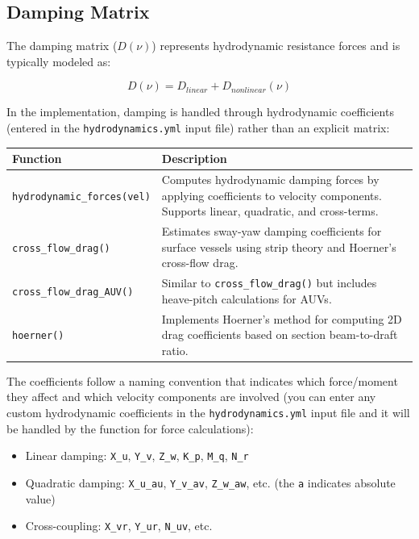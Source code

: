 \documentclass[
  letterpaper,
  DIV=11,
  numbers=noendperiod]{scrreprt}
\providecommand{\tightlist}{%
  \setlength{\itemsep}{0pt}\setlength{\parskip}{0pt}}\usepackage{longtable,booktabs,array}
\begin{document}
\subsection*{Damping Matrix}\label{damping-matrix}

The damping matrix (\(D(\nu)\)) represents hydrodynamic resistance
forces and is typically modeled as:

\[D(\nu) = D_{linear} + D_{nonlinear}(\nu)\]

In the implementation, damping is handled through hydrodynamic
coefficients (entered in the \texttt{hydrodynamics.yml} input file)
rather than an explicit matrix:

\begin{longtable}[]{@{}
  >{\raggedright\arraybackslash}p{}
  >{\raggedright\arraybackslash}p{}@{}}
\toprule\noalign{}
\begin{minipage}[b]{\linewidth}\raggedright
Function
\end{minipage} & \begin{minipage}[b]{\linewidth}\raggedright
Description
\end{minipage} \\
\midrule\noalign{}
\endhead
\bottomrule\noalign{}
\endlastfoot
\texttt{hydrodynamic\_forces(vel)} & Computes hydrodynamic damping
forces by applying coefficients to velocity components. Supports linear,
quadratic, and cross-terms. \\
\texttt{cross\_flow\_drag()} & Estimates sway-yaw damping coefficients
for surface vessels using strip theory and Hoerner's cross-flow drag. \\
\texttt{cross\_flow\_drag\_AUV()} & Similar to
\texttt{cross\_flow\_drag()} but includes heave-pitch calculations for
AUVs. \\
\texttt{hoerner()} & Implements Hoerner's method for computing 2D drag
coefficients based on section beam-to-draft ratio. \\
\end{longtable}

The coefficients follow a naming convention that indicates which
force/moment they affect and which velocity components are involved (you
can enter any custom hydrodynamic coefficients in the
\texttt{hydrodynamics.yml} input file and it will be handled by the
function for force calculations):

\begin{itemize}
\tightlist
\item
  Linear damping: \texttt{X\_u}, \texttt{Y\_v}, \texttt{Z\_w},
  \texttt{K\_p}, \texttt{M\_q}, \texttt{N\_r}
\item
  Quadratic damping: \texttt{X\_u\_au}, \texttt{Y\_v\_av},
  \texttt{Z\_w\_aw}, etc. (the \texttt{a} indicates absolute value)
\item
  Cross-coupling: \texttt{X\_vr}, \texttt{Y\_ur}, \texttt{N\_uv}, etc.
\end{itemize}
\end{document}
